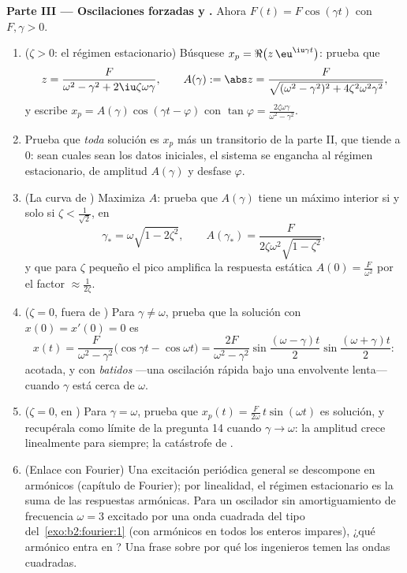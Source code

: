 \begin{problem}
\medskip
\noindent\textbf{Parte III --- Oscilaciones forzadas y
.} Ahora $F(t) = F\cos(\gamma t)$ con $F, \gamma > 0$.
\begin{enumerate}[resume]
  \item ($\zeta > 0$: el régimen estacionario) Búsquese $x_p =
        \Re\bigl(z\,\eu^{\iu\gamma t}\bigr)$: prueba que
        \[
        z = \frac{F}{\omega^2 - \gamma^2 +
        2\iu\zeta\omega\gamma},
        \qquad
        A(\gamma) := \abs z = \frac{F}{\sqrt{(\omega^2 -
        \gamma^2)^2 + 4\zeta^2\omega^2\gamma^2}} ,
        \]
        y escribe $x_p = A(\gamma)\cos(\gamma t - \varphi)$ con
        $\tan\varphi = \frac{2\zeta\omega\gamma}{\omega^2-\gamma^2}$.
  \item Prueba que \emph{toda} solución es $x_p$ más un transitorio
        de la parte II, que tiende a $0$: sean cuales sean los datos
        iniciales, el sistema se engancha al régimen estacionario,
        de amplitud $A(\gamma)$ y desfase $\varphi$.
  \item (La curva de ) Maximiza $A$: prueba que
        $A(\gamma)$ tiene un máximo interior si y solo si $\zeta <
        \frac{1}{\sqrt2}$, en
        \[
        \gamma_* = \omega\sqrt{1 - 2\zeta^2},
        \qquad
        A(\gamma_*) =
        \frac{F}{2\zeta\omega^2\sqrt{1-\zeta^2}} ,
        \]
        y que para $\zeta$ pequeño el pico amplifica la respuesta
        estática $A(0) = \frac F{\omega^2}$ por el factor $\approx
        \frac{1}{2\zeta}$.
  \item ($\zeta = 0$, fuera de ) Para $\gamma \neq
        \omega$, prueba que la solución con $x(0) = x'(0) = 0$ es
        \[
        x(t) = \frac{F}{\omega^2 -
        \gamma^2}\bigl(\cos\gamma t - \cos\omega t\bigr)
        = \frac{2F}{\omega^2-\gamma^2}
        \sin\frac{(\omega-\gamma)t}{2}
        \sin\frac{(\omega+\gamma)t}{2} :
        \]
        acotada, y con \emph{batidos} ---una oscilación rápida bajo
        una envolvente lenta--- cuando $\gamma$ está cerca de
        $\omega$.
  \item ($\zeta = 0$, en ) Para $\gamma = \omega$, prueba
        que $x_p(t) = \frac{F}{2\omega}\,t\sin(\omega t)$ es
        solución, y recupérala como límite de la pregunta 14 cuando
        $\gamma \to \omega$: la amplitud crece linealmente para
        siempre; la catástrofe de .
  \item (Enlace con Fourier) Una excitación periódica general se
        descompone en armónicos (capítulo de Fourier); por
        linealidad, el régimen estacionario es la suma de las
        respuestas armónicas. Para un oscilador sin amortiguamiento
        de frecuencia $\omega = 3$ excitado por una onda cuadrada
        del tipo del~\cref{exo:b2:fourier:1} (con armónicos en todos
        los enteros impares), ¿qué armónico entra en ? Una
        frase sobre por qué los ingenieros temen las ondas
        cuadradas.
\end{enumerate}


\end{problem}
